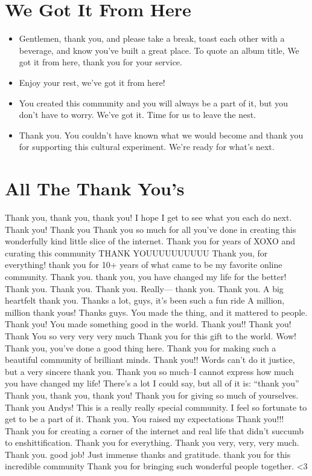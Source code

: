 \documentclass[
]{book}
\providecommand{\tightlist}{%
  \setlength{\itemsep}{0pt}\setlength{\parskip}{0pt}}
\begin{document}
\section{We Got It From Here}\label{we-got-it-from-here}

\begin{itemize}
\tightlist
\item
  Gentlemen, thank you, and please take a break, toast each other with a beverage, and know you've built a great place. To quote an album title, We got it from here, thank you for your service.
\item
  Enjoy your rest, we've got it from here!
\item
  You created this community and you will always be a part of it, but you don't have to worry. We've got it. Time for us to leave the nest.
\item
  Thank you. You couldn't have known what we would become and thank you for supporting this cultural experiment. We're ready for what's next.
\end{itemize}

\section{All The Thank You's}\label{all-the-thank-yous}

Thank you, thank you, thank you! I hope I get to see what you each do next.
Thank you!
Thank you
Thank you so much for all you've done in creating this wonderfully kind little slice of the internet.
Thank you for years of XOXO and curating this community
THANK YOUUUUUUUUUU
Thank you, for everything!
thank you for 10+ years of what came to be my favorite online community.
Thank you.
thank you, you have changed my life for the better!
Thank you.
Thank you.
Thank you. Really--- thank you.
Thank you. A big heartfelt thank you.
Thanks a lot, guys, it's been such a fun ride
A million, million thank yous!
Thanks guys. You made the thing, and it mattered to people.
Thank you! You made something good in the world.
Thank you!!
Thank you!
Thank You so very very very much
Thank you for this gift to the world.
Wow!
Thank you, you've done a good thing here.
Thank you for making such a beautiful community of brilliant minds.
Thank you!!
Words can't do it justice, but a very sincere thank you.
Thank you so much--I cannot express how much you have changed my life!
There's a lot I could say, but all of it is: ``thank you''
Thank you, thank you, thank you!
Thank you for giving so much of yourselves.
Thank you Andys! This is a really really special community. I feel so fortunate to get to be a part of it.
Thank you. You raised my expectations
Thank you!!!
Thank you for creating a corner of the internet and real life that didn't succumb to enshittification.
Thank you for everything. Thank you very, very, very much.
Thank you.
good job!
Just immense thanks and gratitude.
thank you for this incredible community
Thank you for bringing such wonderful people together.
\textless3
\end{document}
